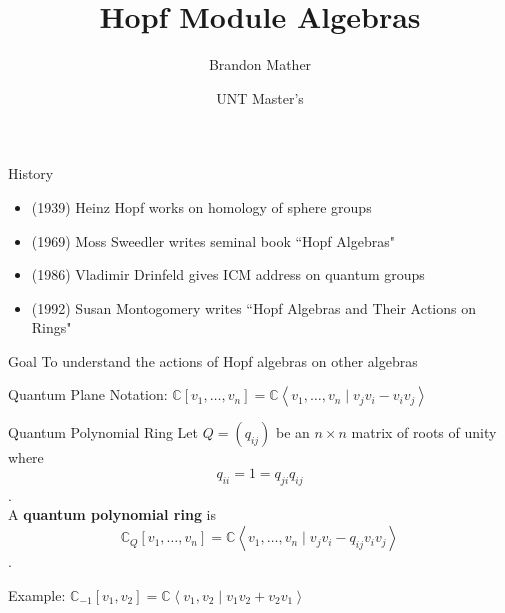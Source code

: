 \documentclass{beamer}
\title{Hopf Module Algebras}
\author{Brandon Mather}
\date{UNT Master's}
\begin{document}
\maketitle

\begin{frame}{History}
    \begin{itemize}\setlength{\itemindent}{-2ex}
        \item (1939) Heinz Hopf works on homology of sphere groups
        \item (1969) Moss Sweedler writes seminal book ``Hopf Algebras"
        \item (1986) Vladimir Drinfeld gives ICM address on quantum groups
        \item (1992) Susan Montogomery writes ``Hopf Algebras and Their Actions on Rings"
    \end{itemize}
    \begin{block}{Goal}
        To understand the actions of Hopf algebras on other algebras
    \end{block}
\end{frame}

\begin{frame}{Quantum Plane}
    Notation: $\mathbb{C}[v_1,\ldots,v_n]=\mathbb{C}\left\langle v_1,\ldots,v_n\;\vert\; v_jv_i-v_iv_j\right\rangle$
    \begin{block}{Quantum Polynomial Ring}
        Let $Q=(q_{ij})$ be an $n\times n$ matrix of roots of unity where \[q_{ii}=1=q_{ji}q_{ij}\].
        \\
        A \textbf{quantum polynomial ring} is \[\mathbb{C}_Q[v_1,\ldots,v_n]=\mathbb{C}\left\langle v_1,\ldots,v_n \;\vert\; v_jv_i-q_{ij}v_iv_j\right\rangle\].
    \end{block}
    Example: $\mathbb{C}_{-1}[v_1,v_2]=\mathbb{C}\left\langle v_1,v_2\;\vert\; v_1 v_2+v_2 v_1\right\rangle$
\end{frame}
\end{document}
